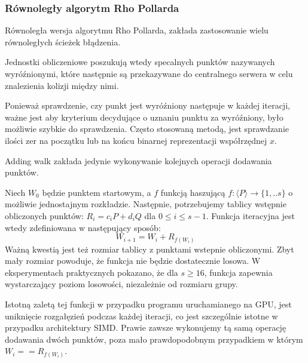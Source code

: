 \subsubsection{Równoległy algorytm Rho Pollarda}
Równoległa wersja algorytmu Rho Pollarda, zakłada zastosowanie wielu równoległych ścieżek błądzenia.
\par
Jednostki obliczeniowe poszukują wtedy specalnych punktów nazywanych wyróźnionymi,
które następnie są przekazywane do centralnego serwera w celu znalezienia kolizji między nimi.
\par
Ponieważ sprawdzenie, czy punkt jest wyróźniony następuje w każdej iteracji,
ważne jest aby kryterium decydujące o uznaniu punktu za wyróźniony, było możliwie
szybkie do sprawdzenia.
Często stosowaną metodą, jest sprawdzanie ilości zer na początku lub na końcu binarnej reprezentacji współrzędnej $x$.
\par
Adding walk zakłada jedynie wykonywanie kolejnych operacji dodawania punktów.

Niech $W_0$ będzie punktem startowym, a $f$ funkcją haszującą $f: \langle P \rangle \rightarrow \{1,..s\}$ o możliwie jednostajnym rozkładzie.
Następnie, potrzebujemy tablicy wstępnie obliczonych punktów:
$R_i = c_i P + d_i Q$ dla $0 \leq i \leq s - 1$.
Funkcja iteracyjna jest wtedy zdefiniowana w następujący sposób:
$$
    W_{i+1} = W_i + R_{f(W_i)}
$$
Ważną kwestią jest też rozmiar tablicy z punktami wstepnie obliczonymi.
Zbyt mały rozmiar powoduje, że funkcja nie będzie dostatecznie losowa.
W eksperymentach praktycznych pokazano, że dla $s \geq 16$, funkcja zapewnia
wystarczający poziom losowości,  niezależnie od rozmiaru grupy.
 \cite{Teske2000}
\par
Istotną zaletą tej funkcji w przypadku programu uruchamianego na GPU,
jest uniknięcie rozgałęzień podczas każdej iteracji, co jest szczególnie istotne w przypadku architektury SIMD.
Prawie zawsze wykonujemy tą samą operację dodawania dwóch punktów,
poza mało prawdopodobnym przypadkiem w którym $W_i == R_{f(W_i)}$.
\par
\newpage